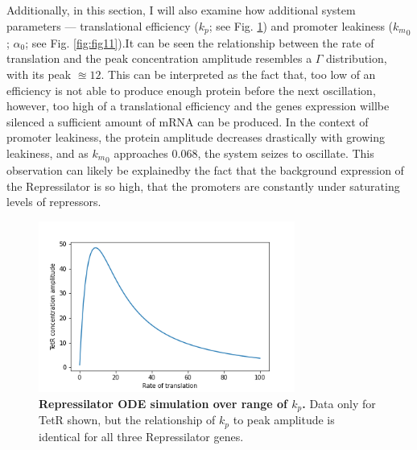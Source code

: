 \documentclass[runningheads,a4paper]{llncs}
\begin{document}
Additionally, in this section, I will also examine how additional system parameters --- translational efficiency ($k_{p}$; see Fig. \ref{fig:fig10}) and promoter leakiness (${k_{m}}_{0}$; $\alpha_{0}$; see Fig. \ref{fig:fig11}).\linebreak It can be seen the relationship between the rate of translation and the peak concentration amplitude resembles a $\Gamma$ distribution, with its peak $\approxeq 12$. This can be interpreted as the fact that, too low of an efficiency is not able to produce enough protein before the next oscillation, however, too high of a translational efficiency and the genes expression will\linebreak be silenced a sufficient amount of mRNA can be produced. In the context of promoter leakiness, the protein amplitude decreases drastically with growing leakiness, and as ${k_{m}}_{0}$ approaches $0.068$, the system seizes to oscillate. This observation can likely be explained\linebreak by the fact that the background expression of the Repressilator is so high, that the promoters are constantly under saturating levels of repressors.

\begin{figure}
    \singlespacing
    \centering
    \includegraphics[width=0.75\textwidth]{suplementary_information_and_code/Task3_figure4.png}
    \caption{\textbf{Repressilator ODE simulation over range of $k_{p}$.} Data only for TetR shown, but the relationship of $k_{p}$ to peak amplitude is identical for all three Repressilator genes.}
    \label{fig:fig10}
\end{figure}
\end{document}
